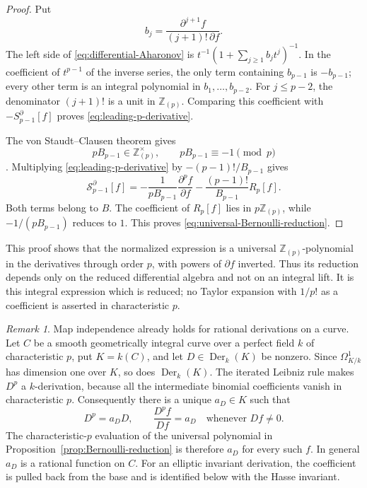 \documentclass[11pt]{amsart}
\theoremstyle{definition}
\theoremstyle{remark}
\newtheorem{remark}[thm]{Remark}
\numberwithin{equation}{section}
\begin{document}
\begin{proof}
Put
\[
b_j=\frac{\partial^{j+1}f}{(j+1)!\,\partial f}.
\]
The left side of \eqref{eq:differential-Aharonov} is
$t^{-1}(1+\sum_{j\geq1}b_jt^j)^{-1}$. In the coefficient of $t^{p-1}$
of the inverse series, the only term containing $b_{p-1}$ is
$-b_{p-1}$; every other term is an integral polynomial in
$b_1,\ldots,b_{p-2}$. For $j\leq p-2$, the denominator $(j+1)!$ is a
unit in $\mathbb Z_{(p)}$. Comparing this coefficient with
$-S_{p-1}^\partial[f]$ proves \eqref{eq:leading-p-derivative}.

The von Staudt--Clausen theorem gives
\begin{equation}\label{eq:Bernoulli-p-unit}
pB_{p-1}\in\mathbb Z_{(p)}^\times,
\qquad pB_{p-1}\equiv-1\pmod p
\end{equation}
\cite[pp.~233--237]{ireland-rosen}. Multiplying
\eqref{eq:leading-p-derivative} by $-(p-1)!/B_{p-1}$ gives
\[
\mathcal S_{p-1}^\partial[f]
=-\frac1{pB_{p-1}}\frac{\partial^p f}{\partial f}
 -\frac{(p-1)!}{B_{p-1}}R_p[f].
\]
Both terms belong to $B$. The coefficient of $R_p[f]$ lies in
$p\mathbb Z_{(p)}$, while $-1/(pB_{p-1})$ reduces to $1$. This proves
\eqref{eq:universal-Bernoulli-reduction}.
\end{proof}

This proof shows that the normalized expression is a universal
$\mathbb Z_{(p)}$-polynomial in the derivatives through order $p$, with
powers of $\partial f$ inverted. Thus its reduction depends only on
the reduced differential algebra and not on an integral lift. It is
this integral expression which is reduced; no Taylor expansion with
$1/p!$ as a coefficient is asserted in characteristic $p$.

\begin{remark}\label{rem:one-dimensional-reduction}
Map independence already holds for rational derivations on a curve.
Let $C$ be a smooth geometrically integral curve over a perfect field
$k$ of characteristic $p$, put $K=k(C)$, and let
$D\in\operatorname{Der}_k(K)$ be nonzero. Since
$\Omega^1_{K/k}$ has dimension one over $K$, so does
$\operatorname{Der}_k(K)$. The iterated Leibniz rule makes $D^p$ a
$k$-derivation, because all the intermediate binomial coefficients
vanish in characteristic $p$. Consequently there is a unique
$a_D\in K$ such that
\[
D^p=a_DD,\qquad \frac{D^pf}{Df}=a_D\quad\text{whenever }Df\neq0.
\]
The characteristic-$p$ evaluation of the universal polynomial in
Proposition~\ref{prop:Bernoulli-reduction} is therefore $a_D$ for
every such $f$. In general $a_D$ is a rational function on $C$.
For an elliptic invariant derivation, the coefficient is pulled back
from the base and is identified below with the Hasse invariant.
\end{remark}
\end{document}
